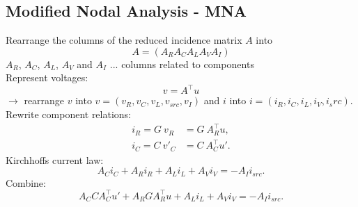 	\subsection{Modified Nodal Analysis - MNA}
	\begin{frame}
		Rearrange the columns of the reduced incidence matrix $A$ into
		\begin{displaymath}
			A = (A_R A_C A_L A_V A_I)
		\end{displaymath}
		$A_R$, $A_C$, $A_L$, $A_V$ and $A_I$ ... columns related to components\\
		Represent voltages:
		\begin{displaymath}
			v = A^\top u
		\end{displaymath}
		$\to$ rearrange $v$ into $v = (v_R, v_C, v_L, v_{src}, v_I)$ and $i$ into $i = (i_R, i_C, i_L, i_V, i_src)$. 
		Rewrite component relations:
		\begin{align*}
			i_R = G \ v_R &= G \ A_R^\top u, \\
			i_C = C \ v'_C &= C \ A_C^\top u'.
		\end{align*}
		Kirchhoffs current law:
		\begin{displaymath}
			A_C i_C + A_R i_R + A_L i_L + A_V i_V = -A_I i_{src}.
		\end{displaymath}
		Combine:
		\begin{displaymath}
			A_C C A_C^\top u' + A_R G A_R^\top u + A_L i_L + A_V i_V = -A_I i_{src}.
		\end{displaymath}
	\end{frame}

